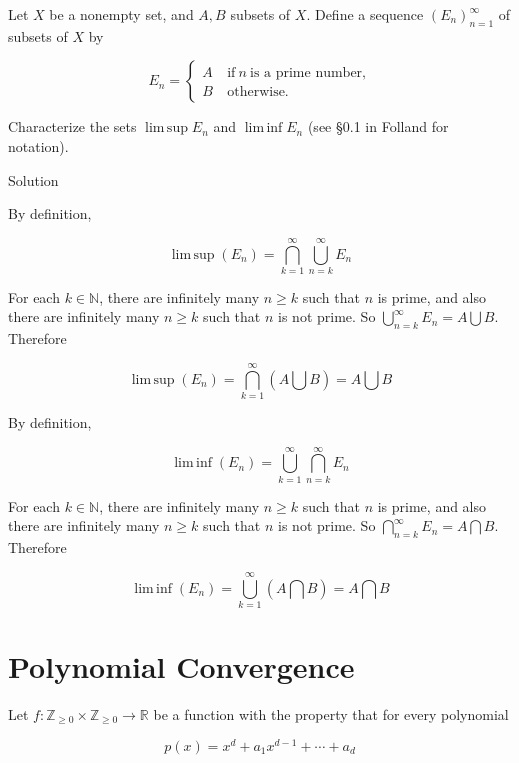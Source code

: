 Let \(X\) be a nonempty set, and \(A,B\) subsets of \(X\). Define a sequence \((E_{n})_{n = 1}^{\infty}\) of subsets of \(X\) by

\[E_{n} = \left\{ \begin{matrix}
{A\ } & {\text{if}\ n\ \text{is a prime number,}} \\
{B\ } & \text{otherwise.}
\end{matrix} \right.\]

Characterize the sets \(\operatorname{lim\, sup}E_{n}\) and \(\operatorname{lim\, inf}E_{n}\) (see §0.1 in Folland for notation).

\begin{qlsolution}{Solution}

By definition,

\[\operatorname{lim\, sup}(E_{n}) = \bigcap\limits_{k = 1}^{\infty}\bigcup\limits_{n = k}^{\infty}E_{n}\]

For each \(k \in \mathbb{N}\), there are infinitely many \(n \geq k\) such that \(n\) is prime, and also there are infinitely many \(n \geq k\) such that \(n\) is not prime. So \(\bigcup_{n = k}^{\infty}E_{n} = A\bigcup B\). Therefore

\[\operatorname{lim\, sup}(E_{n}) = \bigcap\limits_{k = 1}^{\infty}(A\bigcup B) = A\bigcup B\]

By definition,

\[\operatorname{lim\, inf}(E_{n}) = \bigcup\limits_{k = 1}^{\infty}\bigcap\limits_{n = k}^{\infty}E_{n}\]

For each \(k \in \mathbb{N}\), there are infinitely many \(n \geq k\) such that \(n\) is prime, and also there are infinitely many \(n \geq k\) such that \(n\) is not prime. So \(\bigcap_{n = k}^{\infty}E_{n} = A\bigcap B\). Therefore

\[\operatorname{lim\, inf}(E_{n}) = \bigcup\limits_{k = 1}^{\infty}(A\bigcap B) = A\bigcap B\]

\end{qlsolution}

\section{Polynomial Convergence}\label{polynomial-convergence}

Let \(f:\mathbb{Z}_{\geq 0} \times \mathbb{Z}_{\geq 0}\rightarrow\mathbb{R}\) be a function with the property that for every polynomial

\[p(x) = x^{d} + a_{1}x^{d - 1} + \cdots + a_{d}\]

